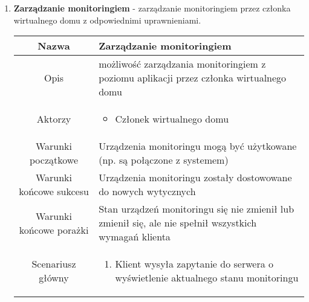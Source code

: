 \documentclass{article}
\begin{document}
\begin{enumerate}
\begin{enumerate}
			\item \textbf{Zarządzanie monitoringiem} - zarządzanie monitoringiem przez
				członka wirtualnego domu z odpowiednimi uprawnieniami.
				\begin{table}[H]
					\centering
					\begin{tabular}{|c|p{7cm}|}
						\hline
						Nazwa                   & \textbf{Zarządzanie monitoringiem}                                                                                                                                                                                                                                              \\
						\hline
						Opis                    & możliwość zarządzania monitoringiem z poziomu aplikacji przez członka wirtualnego domu                                                                                                                                                                                          \\
						\hline
						Aktorzy                 & \begin{itemize}\item Członek wirtualnego domu\end{itemize}                                                                                                                                                                                                                      \\
						\hline
						Warunki początkowe      & Urządzenia monitoringu mogą być użytkowane (np. są połączone z systemem)                                                                                                                                                                                                        \\
						\hline
						Warunki końcowe sukcesu & Urządzenia monitoringu zostały dostowowane do nowych wytycznych                                                                                                                                                                                                                 \\
						\hline
						Warunki końcowe porażki & Stan urządzeń monitoringu się nie zmienił lub zmienił się, ale nie spełnił wszystkich wymagań klienta                                                                                                                                                                           \\
						\hline
						Scenariusz główny       & \begin{enumerate}\item Klient wysyła zapytanie do serwera o wyświetlenie aktualnego stanu monitoringu


\end{enumerate}
\end{tabular}
\end{table}
\end{enumerate}
\end{enumerate}
\end{document}
